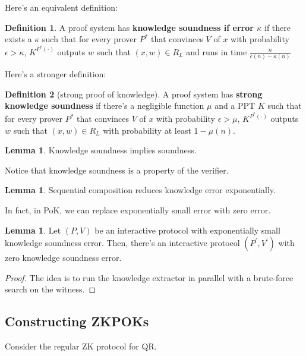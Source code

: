 \documentclass{article}
\theoremstyle{definition}
\newtheorem{definition}{Definition}
\newtheorem{lemma}[theorem]{Lemma}
\begin{document}
Here's an equivalent definition:

\begin{definition}
    A proof system has \textbf{knowledge soundness if error $\kappa$} if there exists
    a $\kappa$ such that for every prover $P^{*}$ that convinces $V$ of $x$ with 
    probability $\epsilon > \kappa$, $K^{P^{*}(\cdot)}$ outputs $w$ such that
    $(x,w) \in R_{L}$ and runs in time $\frac{n}{\epsilon(n) - \kappa(n)}$
\end{definition}

Here's a stronger definition:

\begin{definition}[strong proof of knowledge]
    A proof system has \textbf{strong knowledge soundness} if there's a negligible function $\mu$
    and a PPT $K$ such that for every prover $P^{*}$ that convinces $V$ of $x$ with 
    probability $\epsilon > \mu$, $K^{P^{*}(\cdot)}$ outputs $w$ such that
    $(x,w) \in R_{L}$ with probability at least $1 - \mu(n)$.
\end{definition}

\begin{lemma}
    Knowledge soundness implies soundness.
\end{lemma}

Notice that knowledge soundness is a property of the verifier.

\begin{lemma}
    Sequential composition reduces knowledge error exponentially.
\end{lemma}

In fact, in PoK, we can replace exponentially small error with zero error.

\begin{lemma}
    Let $(P,V)$ be an interactive protocol with exponentially small knowledge soundness error.
    Then, there's an interactive protocol $(P^{\prime}, V^{\prime})$ with zero knowledge
    soundness error.
\end{lemma}
\begin{proof}
    The idea is to run the knowledge extractor in parallel with a brute-force search
    on the witness.


\end{proof}

\subsection{Constructing ZKPOKs}

Consider the regular ZK protocol for QR.
\end{document}
